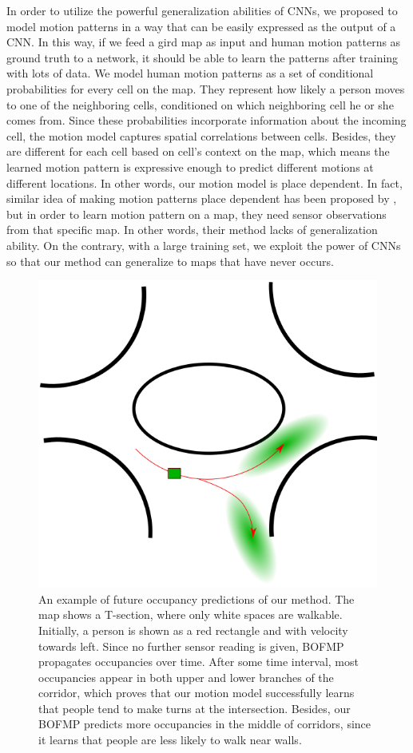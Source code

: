 In order to utilize the powerful generalization abilities of CNNs, we proposed to model motion patterns in a way that can be easily expressed as the output of a CNN. In this way, if we feed a gird map as input and human motion patterns as ground truth to a network, it should be able to learn the patterns after training with lots of data. We model human motion patterns as a set of conditional probabilities for every cell on the map. They represent how likely a person moves to one of the neighboring cells, conditioned on which neighboring cell he or she comes from. Since these probabilities incorporate information about the incoming cell, the motion model captures spatial correlations between cells. Besides, they are different for each cell based on cell's context on the map, which means the learned motion pattern is expressive enough to predict different motions at different locations. In other words, our motion model is place dependent. In fact, similar idea of making motion patterns place dependent has been proposed by \cite{kucner2013conditional}, but in order to learn motion pattern on a map, they need sensor observations from that specific map. In other words, their method lacks of generalization ability. On the contrary, with a large training set, we exploit the power of CNNs so that our method can generalize to maps that have never occurs.

\begin{figure}[H]
  \centering
    \includegraphics[width=.5\textwidth]{figures/roundabout.png}
    \caption[An example of future occupancy predictions of our method.]{An example of future occupancy predictions of our method.  The map shows a T-section, where only white spaces are walkable. Initially, a person is shown as a red rectangle and with velocity towards left. Since no further sensor reading is given, BOFMP propagates occupancies over time. After some time interval, most occupancies appear in both upper and lower branches of the corridor, which proves that our motion model successfully learns that people tend to make turns at the intersection. Besides, our BOFMP predicts more occupancies in the middle of corridors, since it learns that people are less likely to walk near walls.}
    \label{fig:idea}
\end{figure}

